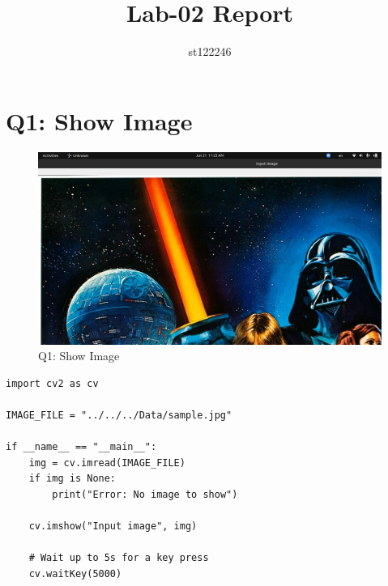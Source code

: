 \documentclass[a4paper,12pt]{article}
\title{Lab-02 Report}
\author{st122246}
\begin{document}
\maketitle

\section{Q1: Show Image}

\begin{figure}
	\caption{Q1: Show Image}
	\includegraphics[scale=0.25]{img/Q1.png}
\end{figure}

\begin{lstlisting}
import cv2 as cv

IMAGE_FILE = "../../../Data/sample.jpg"

if __name__ == "__main__":
	img = cv.imread(IMAGE_FILE)
	if img is None:
		print("Error: No image to show")

	cv.imshow("Input image", img)

	# Wait up to 5s for a key press
	cv.waitKey(5000)
	
\end{lstlisting}
\end{document}

